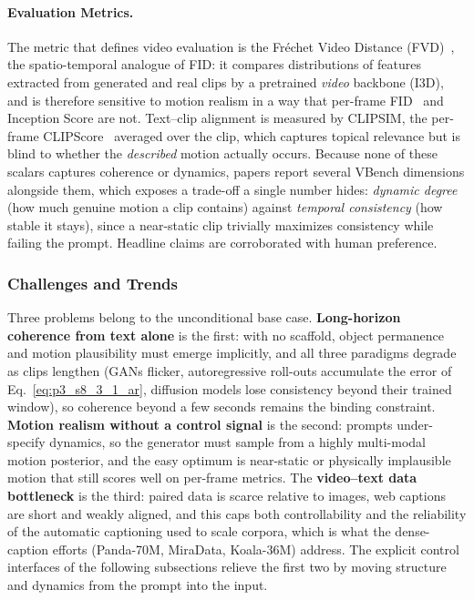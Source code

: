 \paragraph{Evaluation Metrics.}
The metric that defines video evaluation is the Fr\'echet Video Distance (FVD)~\cite{unterthiner2018fvd}, the spatio-temporal analogue of FID: it compares distributions of features extracted from generated and real clips by a pretrained \emph{video} backbone (I3D), and is therefore sensitive to motion realism in a way that per-frame FID~\cite{heusel2017gans} and Inception Score are not. Text--clip alignment is measured by CLIPSIM, the per-frame CLIPScore~\cite{hessel2021clipscore} averaged over the clip, which captures topical relevance but is blind to whether the \emph{described} motion actually occurs. Because none of these scalars captures coherence or dynamics, papers report several VBench dimensions alongside them, which exposes a trade-off a single number hides: \emph{dynamic degree} (how much genuine motion a clip contains) against \emph{temporal consistency} (how stable it stays), since a near-static clip trivially maximizes consistency while failing the prompt. Headline claims are corroborated with human preference.

\subsubsection{Challenges and Trends}
\label{subsubsec:p3_s8_3_1_challenges}
Three problems belong to the unconditional base case. \textbf{Long-horizon coherence from text alone} is the first: with no scaffold, object permanence and motion plausibility must emerge implicitly, and all three paradigms degrade as clips lengthen (GANs flicker, autoregressive roll-outs accumulate the error of Eq.~\eqref{eq:p3_s8_3_1_ar}, diffusion models lose consistency beyond their trained window), so coherence beyond a few seconds remains the binding constraint. \textbf{Motion realism without a control signal} is the second: prompts under-specify dynamics, so the generator must sample from a highly multi-modal motion posterior, and the easy optimum is near-static or physically implausible motion that still scores well on per-frame metrics. The \textbf{video--text data bottleneck} is the third: paired data is scarce relative to images, web captions are short and weakly aligned, and this caps both controllability and the reliability of the automatic captioning used to scale corpora, which is what the dense-caption efforts (Panda-70M, MiraData, Koala-36M) address. The explicit control interfaces of the following subsections relieve the first two by moving structure and dynamics from the prompt into the input.
